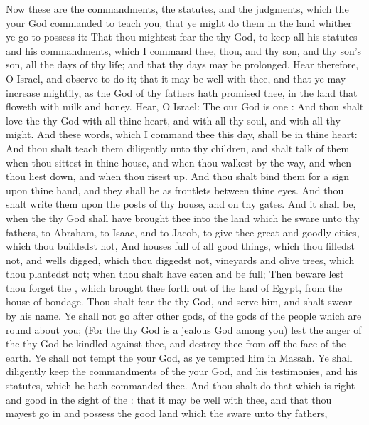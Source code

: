 \begin{biblechapter} %
 Now these are the commandments, the statutes, and the judgments, which the \LORD your God commanded to teach you, that ye might do them in the land whither ye go to possess it:
\verse That thou mightest fear the \LORD thy God, to keep all his statutes and his commandments, which I command thee, thou, and thy son, and thy son's son, all the days of thy life; and that thy days may be prolonged.
\verse Hear therefore, O Israel, and observe to do it; that it may be well with thee, and that ye may increase mightily, as the \LORD God of thy fathers hath promised thee, in the land that floweth with milk and honey.
\verse Hear, O Israel: The \LORD our God is one \LORD:
\verse And thou shalt love the \LORD thy God with all thine heart, and with all thy soul, and with all thy might.
\verse And these words, which I command thee this day, shall be in thine heart:
\verse And thou shalt teach them diligently unto thy children, and shalt talk of them when thou sittest in thine house, and when thou walkest by the way, and when thou liest down, and when thou risest up.
\verse And thou shalt bind them for a sign upon thine hand, and they shall be as frontlets between thine eyes.
\verse And thou shalt write them upon the posts of thy house, and on thy gates.
\verse And it shall be, when the \LORD thy God shall have brought thee into the land which he sware unto thy fathers, to Abraham, to Isaac, and to Jacob, to give thee great and goodly cities, which thou buildedst not,
\verse And houses full of all good things, which thou filledst not, and wells digged, which thou diggedst not, vineyards and olive trees, which thou plantedst not; when thou shalt have eaten and be full;
\verse Then beware lest thou forget the \LORD, which brought thee forth out of the land of Egypt, from the house of bondage.
\verse Thou shalt fear the \LORD thy God, and serve him, and shalt swear by his name.
\verse Ye shall not go after other gods, of the gods of the people which are round about you;
\verse (For the \LORD thy God is a jealous God among you) lest the anger of the \LORD thy God be kindled against thee, and destroy thee from off the face of the earth.
\verse Ye shall not tempt the \LORD your God, as ye tempted him in Massah.
\verse Ye shall diligently keep the commandments of the \LORD your God, and his testimonies, and his statutes, which he hath commanded thee.
\verse And thou shalt do that which is right and good in the sight of the \LORD: that it may be well with thee, and that thou mayest go in and possess the good land which the \LORD sware unto thy fathers,

\end{biblechapter}
